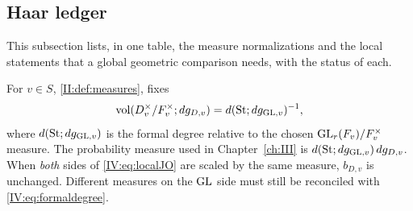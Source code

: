 \subsection{Haar ledger}\label{IV:subsec:ledger}
This subsection lists, in one table, the measure normalizations and the local statements that a global geometric comparison needs, with the status of each.

For $v\in S$, \cref{II:def:measures}, fixes
\begin{equation}\label{IV:eq:formaldegree}
 \operatorname{vol}(D_v^\times/F_v^\times;dg_{D,v})
 =d(\mathrm{St};dg_{\operatorname{GL},v})^{-1},
\end{equation}
where $d(\mathrm{St};dg_{\operatorname{GL},v})$ is the formal degree
relative to the chosen $\operatorname{GL}_r(F_v)/F_v^\times$ measure.
The probability measure used in Chapter~\ref{ch:III} is
$d(\mathrm{St};dg_{\operatorname{GL},v})\,dg_{D,v}$.
When \emph{both} sides of \eqref{IV:eq:localJO} are scaled by the
same measure, $b_{D,v}$ is unchanged.  Different measures on the
$\operatorname{GL}$ side must still be reconciled with \eqref{IV:eq:formaldegree}.

